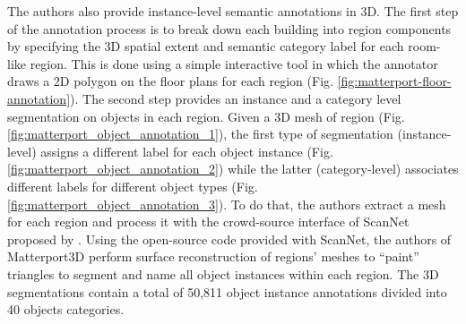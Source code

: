 The authors also provide instance-level semantic annotations in 3D. The first step of the annotation process is to break down each building into region components by specifying the 3D spatial extent and semantic category label for
each room-like region. This is done using a simple interactive tool in which the annotator draws a 2D polygon on the floor plans for each region (Fig. \ref{fig:matterport-floor-annotation}). The second step provides an instance and a category level segmentation on objects in each region. Given a 3D mesh of region (Fig. \ref{fig:matterport_object_annotation_1}), the first type of segmentation (instance-level) assigns a different label for each object instance (Fig. \ref{fig:matterport_object_annotation_2}) while the latter (category-level) associates different labels for different object types (Fig. \ref{fig:matterport_object_annotation_3}). To do that, the authors extract a mesh for each region and process it with the crowd-source interface of ScanNet  proposed by \citeauthor{scannet} \cite{scannet}. Using the open-source code provided with ScanNet, the authors of Matterport3D perform surface reconstruction of regions' meshes to ``paint'' triangles to segment and name all object instances
within each region. The 3D segmentations contain a total of 50,811 object
instance annotations divided into 40 objects categories.

